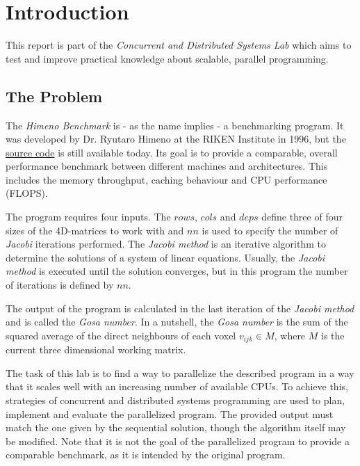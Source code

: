 \newcommand{\reporttitle}{Himeno benchmark}
\newcommand{\hb}{\textit{Himeno Benchmark}}
\newcommand{\jm}{\textit{Jacobi method}}




\setspacings
\maketitle

\clearpage
\setcounter{page}{1}

\section{Introduction}
\label{sec:introduction}

This report is part of the \textit{Concurrent and Distributed Systems Lab} which aims to test and improve practical knowledge about scalable, parallel programming.

\subsection{The Problem}
\label{ssec:problem}

The \hb{} is - as the name implies - a benchmarking program. It was developed by Dr. Ryutaro Himeno at the RIKEN Institute in 1996, but the \href{https://i.riken.jp/en/supercom/documents/himenobmt/}{source code} is still available today. Its goal is to provide a comparable, overall performance benchmark between different machines and architectures. This includes the memory throughput, caching behaviour and CPU performance (FLOPS).

The program requires four inputs. The $rows$, $cols$ and $deps$ define three of four sizes of the 4D-matrices to work with and $nn$ is used to specify the number of \textit{Jacobi} iterations performed. The \jm{} is an iterative algorithm to determine the solutions of a system of linear equations. Usually, the \jm{} is executed until the solution converges, but in this program the number of iterations is defined by $nn$.

The output of the program is calculated in the last iteration of the \jm{} and is called the \textit{Gosa number}. In a nutshell, the \textit{Gosa number} is the sum of the squared average of the direct neighbours of each voxel $v_{ijk} \in M$, where $M$ is the current three dimensional working matrix.

The task of this lab is to find a way to parallelize the described program in a way that it scales well with an increasing number of available CPUs. To achieve this, strategies of concurrent and distributed systems programming are used to plan, implement and evaluate the parallelized program. The provided output must match the one given by the sequential solution, though the algorithm itself may be modified. Note that it is not the goal of the parallelized program to provide a comparable benchmark, as it is intended by the original program.


